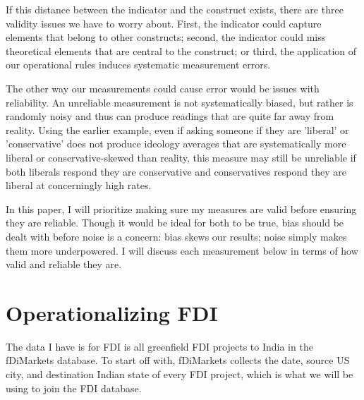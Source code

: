 \documentclass[doublespace,nopageskip]{UVAthesis}
\begin{document}
    If this distance between the indicator and the construct exists, there are three validity issues we have to worry about. First, the indicator could capture elements that belong to other constructs; second, the indicator could miss theoretical elements that are central to the construct; or third, the application of our operational rules induces systematic measurement errors.

    The other way our measurements could cause error would be issues with reliability. An unreliable measurement is not systematically biased, but rather is randomly noisy and thus can produce readings that are quite far away from reality. Using the earlier example, even if asking someone if they are 'liberal' or 'conservative' does not produce ideology averages that are systematically more liberal or conservative-skewed than reality, this measure may still be unreliable if both liberals respond they are conservative and conservatives respond they are liberal at concerningly high rates. 

   In this paper, I will prioritize making sure my measures are valid before ensuring they are reliable. Though it would be ideal for both to be true, bias should be dealt with before noise is a concern: bias skews our results; noise simply makes them more underpowered. I will discuss each measurement below in terms of how valid and reliable they are.
   
           
        \section{Operationalizing FDI} \label{ss:operationalizing FDI}
    The data I have is for FDI is all greenfield FDI projects to India in the fDiMarkets database. To start off with, fDiMarkets collects the date, source US city, and destination Indian state of every FDI project, which is what we will be using to join the FDI database.
    
\end{document}
